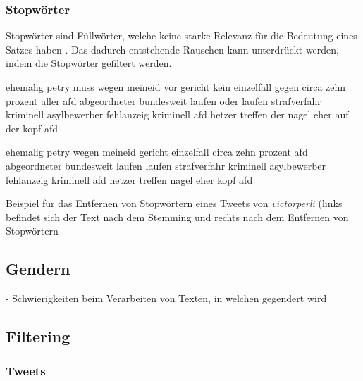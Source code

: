 \subsubsection{Stopwörter}


Stopwörter sind Füllwörter, welche keine starke Relevanz für die Bedeutung eines Satzes haben \autocite[4]{kowsari_text_2019}. Das dadurch entstehende Rauschen kann unterdrückt werden, indem die Stopwörter gefiltert werden.


\begin{code}[H]
    \begin{minipage}{0.45\textwidth}
        \small
        ehemalig petry muss wegen meineid vor gericht kein einzelfall gegen circa zehn prozent aller afd abgeordneter bundesweit laufen oder laufen strafverfahr kriminell asylbewerber fehlanzeig kriminell afd hetzer treffen der nagel eher auf der kopf afd
    \end{minipage}\hfill
    \begin{minipage}{0.45\textwidth}
        \small
        ehemalig petry wegen meineid gericht einzelfall circa zehn prozent afd abgeordneter bundesweit laufen laufen strafverfahr kriminell asylbewerber fehlanzeig kriminell afd hetzer treffen nagel eher kopf afd
    \end{minipage}\hfill
    \caption[Beispiel -- Entfernen von Stopwörtern]{Beispiel für das Entfernen von Stopwörtern eines Tweets von \textit{victorperli} (links befindet sich der Text nach dem Stemming und rechts nach dem Entfernen von Stopwörtern} \label{list:stopwords}
\end{code}

\subsection{Gendern} \label{subsec:gendering}

- Schwierigkeiten beim Verarbeiten von Texten, in welchen gegendert wird

\subsection{Filtering} \label{subsec:filtering}

\subsubsection{Tweets}

